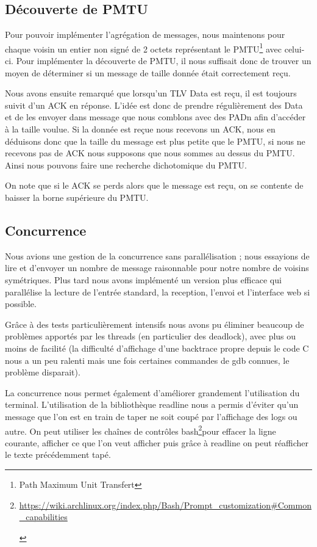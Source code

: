 \documentclass[a4paper,10pt]{article} %
\let\urlorig\url
\renewcommand{\url}[1]{\begin{otherlanguage}{english}\urlorig{#1}\end{otherlanguage}}
\begin{document}
\subsection{Découverte de PMTU\label{sec:pmtu}}

Pour pouvoir implémenter l'agrégation de messages, nous maintenons pour chaque voisin un entier non signé de 2 octets représentant le \textrm{PMTU}\footnote{Path Maximum Unit Transfert} avec celui-ci. Pour implémenter la découverte de \textrm{PMTU}, il nous suffisait donc de trouver un moyen de déterminer si un message de taille donnée était correctement reçu.

Nous avons ensuite remarqué que lorsqu'un TLV Data est reçu, il est toujours suivit d'un ACK en réponse. L'idée est donc de prendre régulièrement des Data et de les envoyer dans message que nous comblons avec des PADn afin d’accéder à la taille voulue. Si la donnée est reçue nous recevons un ACK, nous en déduisons donc que la taille du message est plus petite que le \textrm{PMTU}, si nous ne recevons pas de ACK nous supposons que nous sommes au dessus du \textrm{PMTU}. Ainsi nous pouvons faire une recherche dichotomique du PMTU.

On note que si le ACK se perds alors que le message est reçu, on se contente de baisser la borne supérieure du PMTU.

\subsection{Concurrence\label{sec:con}}
Nous avions une gestion de la concurrence sans parallélisation ; nous essayions de lire et d'envoyer un nombre de message raisonnable pour notre nombre de voisins symétriques. Plus tard nous avons implémenté un version plus efficace qui parallélise la lecture de l'entrée standard, la reception, l'envoi et l'interface web si possible.

Grâce à des tests particulièrement intensifs nous avons pu éliminer beaucoup de problèmes apportés par les threads (en particulier des deadlock), avec plus ou moins de facilité (la difficulté d'affichage d'une backtrace propre depuis le code C nous a un peu ralenti mais une fois certaines commandes de gdb connues, le problème disparait).

La concurrence nous permet également d'améliorer grandement l'utilisation du terminal. L'utilisation de la bibliothèque readline nous a permis d'éviter qu'un message que l'on est en train de taper ne soit coupé par l'affichage des logs ou autre. On peut utiliser les chaînes de contrôles bash\footnote{\url{https://wiki.archlinux.org/index.php/Bash/Prompt\_customization\#Common\_capabilities}}pour effacer la ligne courante, afficher ce que l'on veut afficher puis grâce à readline on peut réafficher le texte précédemment tapé.
\end{document}
